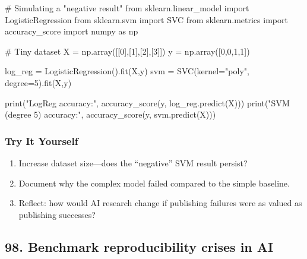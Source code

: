 \documentclass[
  letterpaper,
  DIV=11,
  numbers=noendperiod]{scrreprt}
\newenvironment{Shaded}{\begin{snugshade}}{\end{snugshade}}
\newcommand{\BuiltInTok}[1]{\textcolor[rgb]{0.00,0.23,0.31}{#1}}
\newcommand{\CommentTok}[1]{\textcolor[rgb]{0.37,0.37,0.37}{#1}}
\newcommand{\DecValTok}[1]{\textcolor[rgb]{0.68,0.00,0.00}{#1}}
\newcommand{\ImportTok}[1]{\textcolor[rgb]{0.00,0.46,0.62}{#1}}
\newcommand{\NormalTok}[1]{\textcolor[rgb]{0.00,0.23,0.31}{#1}}
\newcommand{\OperatorTok}[1]{\textcolor[rgb]{0.37,0.37,0.37}{#1}}
\newcommand{\StringTok}[1]{\textcolor[rgb]{0.13,0.47,0.30}{#1}}
\providecommand{\tightlist}{%
  \setlength{\itemsep}{0pt}\setlength{\parskip}{0pt}}
\begin{document}
\begin{Shaded}
\begin{Highlighting}[]
\CommentTok{\# Simulating a "negative result"}
\ImportTok{from}\NormalTok{ sklearn.linear\_model }\ImportTok{import}\NormalTok{ LogisticRegression}
\ImportTok{from}\NormalTok{ sklearn.svm }\ImportTok{import}\NormalTok{ SVC}
\ImportTok{from}\NormalTok{ sklearn.metrics }\ImportTok{import}\NormalTok{ accuracy\_score}
\ImportTok{import}\NormalTok{ numpy }\ImportTok{as}\NormalTok{ np}

\CommentTok{\# Tiny dataset}
\NormalTok{X }\OperatorTok{=}\NormalTok{ np.array([[}\DecValTok{0}\NormalTok{],[}\DecValTok{1}\NormalTok{],[}\DecValTok{2}\NormalTok{],[}\DecValTok{3}\NormalTok{]])}
\NormalTok{y }\OperatorTok{=}\NormalTok{ np.array([}\DecValTok{0}\NormalTok{,}\DecValTok{0}\NormalTok{,}\DecValTok{1}\NormalTok{,}\DecValTok{1}\NormalTok{])}

\NormalTok{log\_reg }\OperatorTok{=}\NormalTok{ LogisticRegression().fit(X,y)}
\NormalTok{svm }\OperatorTok{=}\NormalTok{ SVC(kernel}\OperatorTok{=}\StringTok{"poly"}\NormalTok{, degree}\OperatorTok{=}\DecValTok{5}\NormalTok{).fit(X,y)}

\BuiltInTok{print}\NormalTok{(}\StringTok{"LogReg accuracy:"}\NormalTok{, accuracy\_score(y, log\_reg.predict(X)))}
\BuiltInTok{print}\NormalTok{(}\StringTok{"SVM (degree 5) accuracy:"}\NormalTok{, accuracy\_score(y, svm.predict(X)))}
\end{Highlighting}
\end{Shaded}

\subsubsection{Try It Yourself}\label{try-it-yourself-96}

\begin{enumerate}
\def\labelenumi{\arabic{enumi}.}
\tightlist
\item
  Increase dataset size---does the ``negative'' SVM result persist?
\item
  Document why the complex model failed compared to the simple baseline.
\item
  Reflect: how would AI research change if publishing failures were as
  valued as publishing successes?
\end{enumerate}

\subsection{98. Benchmark reproducibility crises in
AI}\label{benchmark-reproducibility-crises-in-ai}
\end{document}
